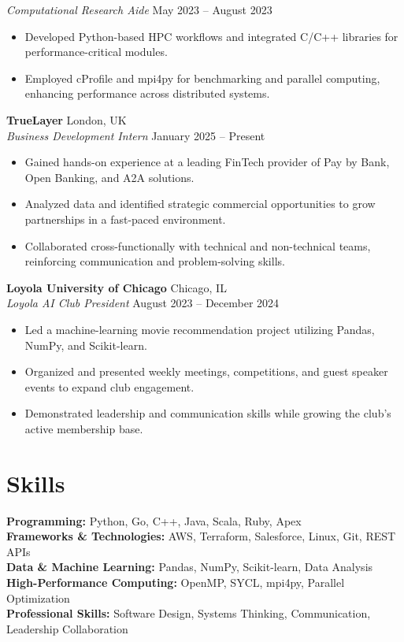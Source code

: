 \documentclass[a4paper,10pt]{article}
\begin{document}
\vspace{0.5em}

\textit{Computational Research Aide} \hfill May 2023 -- August 2023
\begin{itemize}
    \item Developed Python-based HPC workflows and integrated C/C++ libraries for performance-critical modules.
    \item Employed cProfile and mpi4py for benchmarking and parallel computing, enhancing performance across distributed systems.
\end{itemize}

\vspace{0.5em}

\textbf{TrueLayer} \hfill London, UK\\
\textit{Business Development Intern} \hfill January 2025 -- Present
\begin{itemize}
    \item Gained hands-on experience at a leading FinTech provider of Pay by Bank, Open Banking, and A2A solutions.
    \item Analyzed data and identified strategic commercial opportunities to grow partnerships in a fast-paced environment.
    \item Collaborated cross-functionally with technical and non-technical teams, reinforcing communication and problem-solving skills.
\end{itemize}

\vspace{0.5em}

\textbf{Loyola University of Chicago} \hfill Chicago, IL\\
\textit{Loyola AI Club President} \hfill August 2023 -- December 2024
\begin{itemize}
    \item Led a machine-learning movie recommendation project utilizing Pandas, NumPy, and Scikit-learn.
    \item Organized and presented weekly meetings, competitions, and guest speaker events to expand club engagement.
    \item Demonstrated leadership and communication skills while growing the club’s active membership base.
\end{itemize}

\section*{Skills}
\textbf{ Programming:} Python, Go, C++, Java, Scala, Ruby, Apex\\
\vspace{0.25em}
\textbf{Frameworks \& Technologies:} AWS, Terraform, Salesforce, Linux, Git, REST APIs\\
\vspace{0.25em}
\textbf{Data \& Machine Learning:} Pandas, NumPy, Scikit-learn, Data Analysis\\
\vspace{0.25em}
\textbf{High-Performance Computing:} OpenMP, SYCL, mpi4py, Parallel Optimization\\
\vspace{0.25em}
\textbf{Professional Skills:} Software Design, Systems Thinking, Communication, Leadership
Collaboration
\end{document}
